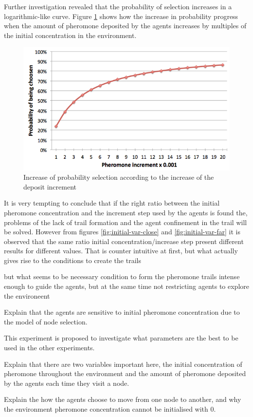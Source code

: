 Further investigation revealed that the probability of selection increases in a logarithmic-like curve. Figure \ref{fig:prob-inc} shows how the increase in probability progress when the amount of pheromone deposited by the agents increases by multiples of the initial concentration in the environment.

\begin{figure}[H]
  \centering
  \includegraphics[width=0.6\linewidth]{gfx/probability-increase.png}
  \caption{Increase of probability selection according to the increase of the deposit increment}
  \label{fig:prob-inc}
\end{figure}

It is very tempting to conclude that if the right ratio between the initial pheromone concentration and the increment step used by the agents is found the, problems of the lack of trail formation and the agent confinement in the trail will be solved. However from figures \ref{fig:initial-var-close} and \ref{fig:initial-var-far} it is observed that the same ratio initial concentration/increase step present different results for different values. That is counter intuitive at first, but what actually gives rise to the conditions to create the trails 

but what seems to be necessary condition to form the pheromone trails intense enough to guide the agents, but at the same time not restricting agents to explore the environeent 

Explain that the agents are sensitive to initial pheromone concentration due to the model of node selection.

This experiment is proposed to investigate what parameters are the best to be used in the other experiments.

Explain that there are two variables important here, the initial concentration of pheromone throughout the environment and the amount of pheromone deposited by the agents each time they visit a node.

Explain the how the agents choose to move from one node to another, and why the environment pheromone concentration cannot be initialised with 0.

